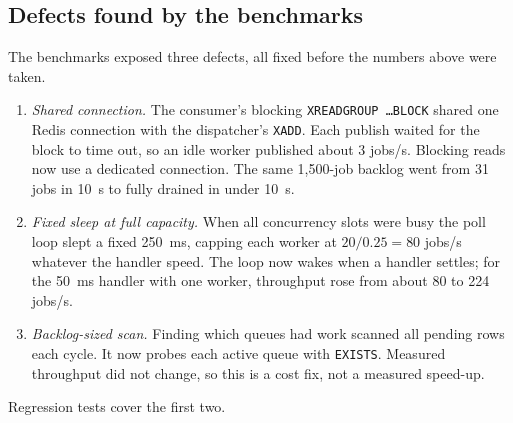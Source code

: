 \documentclass[conference]{IEEEtran}
\newcommand{\code}[1]{\texttt{\small #1}}
\begin{document}
\subsection{Defects found by the benchmarks}
The benchmarks exposed three defects, all fixed before the numbers above were taken.
\begin{enumerate}
  \item \emph{Shared connection.} The consumer's blocking \code{XREADGROUP \ldots BLOCK} shared one Redis connection with the dispatcher's \code{XADD}. Each publish waited for the block to time out, so an idle worker published about 3 jobs/s. Blocking reads now use a dedicated connection. The same 1{,}500-job backlog went from 31 jobs in 10~s to fully drained in under 10~s.
  \item \emph{Fixed sleep at full capacity.} When all concurrency slots were busy the poll loop slept a fixed 250~ms, capping each worker at $20/0.25=80$ jobs/s whatever the handler speed. The loop now wakes when a handler settles; for the 50~ms handler with one worker, throughput rose from about 80 to 224 jobs/s.
  \item \emph{Backlog-sized scan.} Finding which queues had work scanned all pending rows each cycle. It now probes each active queue with \code{EXISTS}. Measured throughput did not change, so this is a cost fix, not a measured speed-up.
\end{enumerate}
Regression tests cover the first two.

\end{document}
